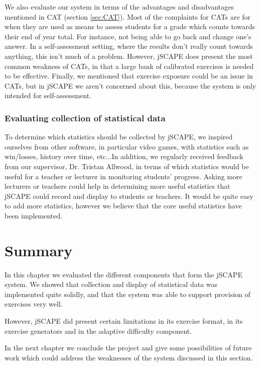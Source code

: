 We also evaluate our system in terms of the advantages and disadvantages mentioned in CAT (section \ref{sec:CAT}). Most of the complaints for CATs are for when they are used as means to assess students for a grade which counts towards their end of year total. For instance, not being able to go back and change one's answer. In a self-assessment setting, where the results don't really count towards anything, this isn't much of a problem. However, jSCAPE does present the most common weakness of CATs, in that a large bank of calibrated exercises is needed to be effective. Finally, we mentioned that exercise exposure could be an issue in CATs, but in jSCAPE we aren't concerned about this, because the system is only intended for self-assessment.

\subsubsection{Evaluating collection of statistical data}
To determine which statistics should be collected by jSCAPE, we inspired ourselves from other software, in particular video games, with statistics such as win/losses, history over time, etc...In addition, we regularly received feedback from our supervisor, Dr. Tristan Allwood, in terms of which statistics would be useful for a teacher or lecturer in monitoring students' progress. Asking more lecturers or teachers could help in determining more useful statistics that jSCAPE could record and display to students or teachers. It would be quite easy to add more statistics, however we believe that the core useful statistics have been implemented.

\section{Summary}
In this chapter we evaluated the different components that form the jSCAPE system. We showed that collection and display of statistical data was implemented quite solidly, and that the system was able to support provision of exercises very well.\newline

However, jSCAPE did present certain limitations in its exercise format, in its exercise generators and in the adaptive difficulty component. \newline

In the next chapter we conclude the project and give some possibilities of future work which could address the weaknesses of the system discussed in this section.